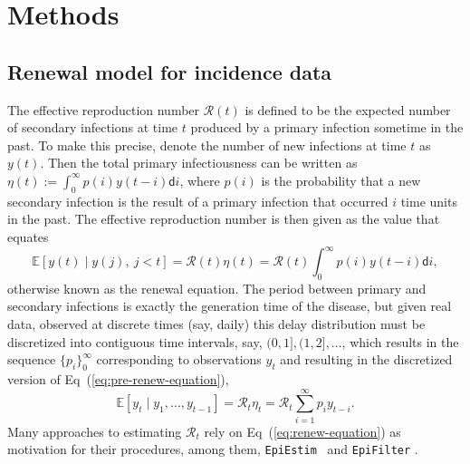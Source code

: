 \documentclass[10pt,letterpaper]{article}
\def\EpiEstim{\texttt{EpiEstim}}
\def\bbE{\mathbb{E}}
\def\calR{\mathcal{R}}
\def\diff{\mathsf{d}}
\newcommand{\citep}[1]{\cite{#1}}
\renewcommand{\eqref}[1]{Eq~(\ref{#1})}
\begin{document}
\section{Methods}

\subsection{Renewal model for incidence data} 

The effective reproduction number $\calR(t)$ is defined to be the expected
number of secondary infections at time $t$ produced by a primary infection
sometime in the past. To make this precise, denote the number of new infections
at time $t$ as $y(t)$. Then the total primary infectiousness can be written as
$\eta(t) := \int_0^{\infty} p(i) y(t-i) \diff i$, where $p(i)$ is the
probability that a new secondary infection is the result of a primary infection
that occurred $i$ time units in the past. The effective reproduction number is then given
as the value that equates
\begin{equation} \label{eq:pre-renew-equation}
  \bbE[y(t) \mid y(j),\ j<t]=\calR(t)\eta(t)=\calR(t)\int_0^\infty p(i)y(t-i)\diff i,
\end{equation}
otherwise known as the renewal equation. The period between primary and secondary
infections is exactly the generation time of the disease, but given real data,
observed at discrete times (say, daily) this delay distribution must be discretized
into contiguous time intervals,
say, $(0,1], (1,2], \dots$, which results in the sequence $\{p_i\}_0^\infty$
corresponding to observations $y_t$ and resulting in the
discretized version of \eqref{eq:pre-renew-equation},
\begin{equation} \label{eq:renew-equation}
  \bbE[y_t \mid y_1,\ldots,y_{t-1}]=\calR_t\eta_t=\calR_t\sum_{i = 1}^\infty p_i y_{t-i}.
\end{equation}
Many approaches to estimating $\calR_t$ rely on \eqref{eq:renew-equation} as
motivation for their procedures, among them, \EpiEstim\ \citep{cori2013new} 
and \texttt{EpiFilter} \citep{parag2021improved}. 
\end{document}
